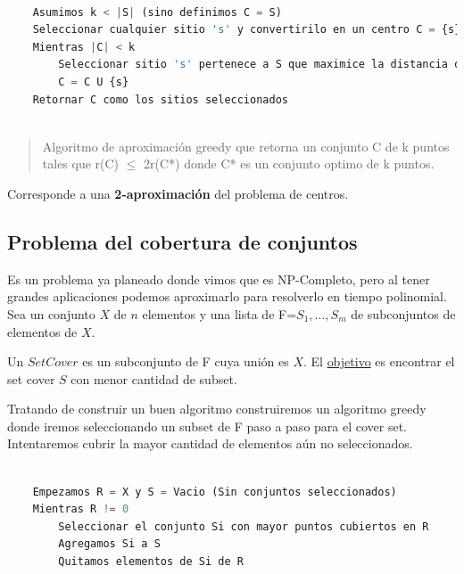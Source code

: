 \documentclass{article}
\begin{document}
\begin{lstlisting}[language=Python, caption=Algoritmo de aproximación greedy]
    
    Asumimos k < |S| (sino definimos C = S)
    Seleccionar cualquier sitio 's' y convertirilo en un centro C = {s} 
    Mientras |C| < k
        Seleccionar sitio 's' pertenece a S que maximice la distancia dist(s,C)
        C = C U {s}
    Retornar C como los sitios seleccionados
    
\end{lstlisting}    

\begin{quote}
    Algoritmo de aproximación greedy que retorna un conjunto C de k puntos tales que r(C) \( \leq \) 2r(C*) donde C* es un conjunto optimo de k puntos.
\end{quote}

Corresponde a una \textbf{2-aproximación} del problema de centros.

\newpage
\subsection{Problema del cobertura de conjuntos}
Es un problema ya planeado donde vimos que es NP-Completo, pero al tener grandes aplicaciones podemos
aproximarlo para resolverlo en tiempo polinomial.
Sea un conjunto \(X\) de \(n\) elementos y una lista de F={\(S_1,...,S_m\)} de subconjuntos de elementos de \(X\).

Un \(Set Cover\) es un subconjunto de F cuya unión es \(X\). El \underline{objetivo} es encontrar el set cover \(S\) con menor cantidad de subset.

Tratando de construir un buen algoritmo construiremos un algoritmo greedy donde iremos seleccionando
un subset de F paso a paso para el cover set. Intentaremos cubrir la mayor cantidad de elementos aún
no seleccionados.

\begin{lstlisting}[language=Python, caption=Algoritmo de aproximación greedy]
    
    Empezamos R = X y S = Vacio (Sin conjuntos seleccionados)
    Mientras R != 0
        Seleccionar el conjunto Si con mayor puntos cubiertos en R
        Agregamos Si a S
        Quitamos elementos de Si de R

\end{lstlisting}   
\end{document}
